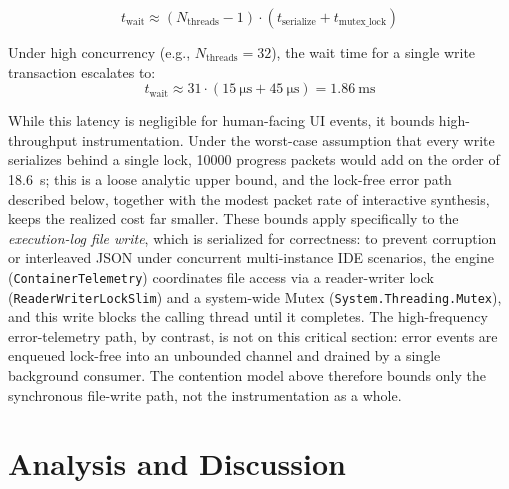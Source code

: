 \begin{equation}
t_{\text{wait}} \approx (N_{\text{threads}} - 1) \cdot (t_{\text{serialize}} + t_{\text{mutex\_lock}})
\end{equation}

Under high concurrency (e.g., $N_{\text{threads}} = 32$), the wait time for a single write transaction escalates to:
\begin{equation}
t_{\text{wait}} \approx 31 \cdot (\SI{15}{\micro\second} + \SI{45}{\micro\second}) = \SI{1.86}{\milli\second}
\end{equation}

While this latency is negligible for human-facing UI events, it bounds high-throughput instrumentation. Under the worst-case assumption that every write serializes behind a single lock, \num{10000} progress packets would add on the order of \SI{18.6}{\second}; this is a loose analytic upper bound, and the lock-free error path described below, together with the modest packet rate of interactive synthesis, keeps the realized cost far smaller.
These bounds apply specifically to the \emph{execution-log file write}, which is serialized for correctness: to prevent corruption or interleaved JSON under concurrent multi-instance IDE scenarios, the engine (\texttt{ContainerTelemetry}) coordinates file access via a reader-writer lock (\texttt{ReaderWriterLockSlim}) and a system-wide Mutex (\texttt{System.Threading.Mutex}), and this write blocks the calling thread until it completes. The high-frequency error-telemetry path, by contrast, is not on this critical section: error events are enqueued lock-free into an unbounded channel and drained by a single background consumer. The contention model above therefore bounds only the synchronous file-write path, not the instrumentation as a whole.

\section{Analysis and Discussion}

